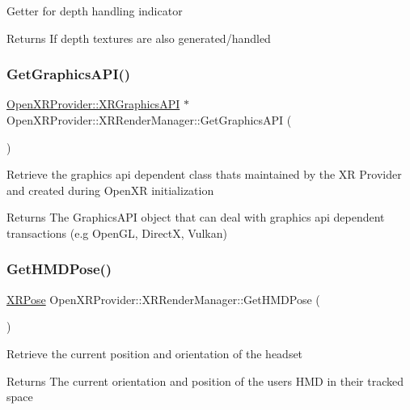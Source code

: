 Getter for depth handling indicator \begin{DoxyReturn}{Returns}
If depth textures are also generated/handled 
\end{DoxyReturn}
\mbox{\label{class_open_x_r_provider_1_1_x_r_render_manager_a7484db5238c64c870c189c8db3403b83}} 
\subsubsection{\texorpdfstring{GetGraphicsAPI()}{GetGraphicsAPI()}}
{\footnotesize\ttfamily \mbox{\hyperlink{class_open_x_r_provider_1_1_x_r_graphics_a_p_i}{Open\+X\+R\+Provider\+::\+X\+R\+Graphics\+A\+PI}} $\ast$ Open\+X\+R\+Provider\+::\+X\+R\+Render\+Manager\+::\+Get\+Graphics\+A\+PI (\begin{DoxyParamCaption}{ }\end{DoxyParamCaption})}

Retrieve the graphics api dependent class that\textquotesingle{}s maintained by the XR Provider and created during Open\+XR initialization \begin{DoxyReturn}{Returns}
The Graphics\+A\+PI object that can deal with graphics api dependent transactions (e.\+g Open\+GL, DirectX, Vulkan) 
\end{DoxyReturn}
\mbox{\label{class_open_x_r_provider_1_1_x_r_render_manager_a02a943efc18f105316b86a669d20ef2e}} 
\subsubsection{\texorpdfstring{GetHMDPose()}{GetHMDPose()}}
{\footnotesize\ttfamily \mbox{\hyperlink{struct_open_x_r_provider_1_1_x_r_pose}{X\+R\+Pose}} Open\+X\+R\+Provider\+::\+X\+R\+Render\+Manager\+::\+Get\+H\+M\+D\+Pose (\begin{DoxyParamCaption}{ }\end{DoxyParamCaption})}

Retrieve the current position and orientation of the headset \begin{DoxyReturn}{Returns}
The current orientation and position of the user\textquotesingle{}s H\+MD in their tracked space 
\end{DoxyReturn}
\mbox{\label{class_open_x_r_provider_1_1_x_r_render_manager_af6289267e9bf20f6e4d65e4051dd9944}} 
